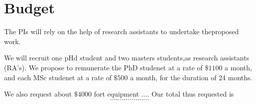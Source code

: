 \section{Budget}

The PIs will rely on the help of research assistants to undertake
theproposed work.

We will recruit one pHd student and two masters students,as research
assistants (RA's).
 We propose to
remunerate the PhD studenet  at a rate of $\$1100$ a month,
and each MSc studenet  at a rate of $\$500$ a month,
 for the duration of 24 months.

We also request about $\$4000$ fort equipment .... Our total thus requested
is
\[
....................
\]
